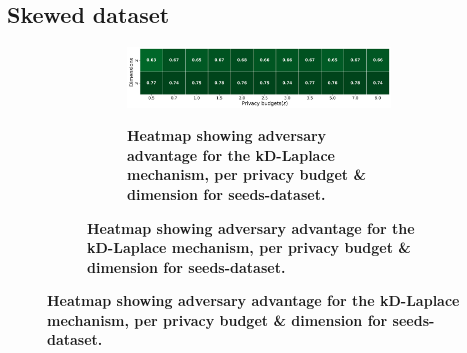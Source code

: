 \subsection{Skewed dataset}
\begin{figure}[H]
      \centering
      \begin{subfigure}[b]{0.85\textwidth}
            \begin{subfigure}[c]{1\textwidth}
                  \caption{\textbf{Heatmap showing adversary advantage for the kD-Laplace mechanism, per privacy budget \& dimension for seeds-dataset.}}
                  \includegraphics[width=1\textwidth]{Results/kd-laplace/kd-Laplace/skewed-dataset/shokri_mi_adv.png}
                  \label{fig:privacy_skewed-dataset_adversial_advantage_kd-laplace}
            \end{subfigure}
            \vfill %


\end{subfigure}
\end{figure}
